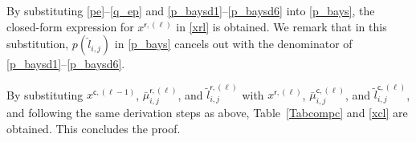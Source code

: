 \documentclass[journal]{IEEEtran}
\newcommand{\mep}{{x}}
\newcommand{\row}{\mathsf{r}}
\newcommand{\col}{\mathsf{c}}
\newcommand{\opt}{\tilde{l}}
\begin{document}
By substituting \eqref{pe}--\eqref{q_ep} and \eqref{p_baysd1}--\eqref{p_baysd6} into \eqref{p_bays}, the closed-form expression for $\mep^{\row,(\ell)}$ in \eqref{xrl} is obtained. We remark that in this substitution, $p({\hat l_{i,j}})$ in \eqref{p_bays} cancels out with the denominator of \eqref{p_baysd1}--\eqref{p_baysd6}.  



By substituting $\mep^{\col,(\ell-1)}$, $\bar \mu _{i,j}^{\row,(\ell )}$, and $\opt_{i,j}^{\mathsf r, (\ell)}$ with $\mep^{\row,(\ell)}$, $\bar \mu _{i,j}^{\col,(\ell )}$, and $\opt_{i,j}^{\mathsf c, (\ell)}$, and following the same derivation steps as above, Table~\ref{Tabcompc} and \eqref{xcl} are obtained. This concludes the proof.
\end{document}
